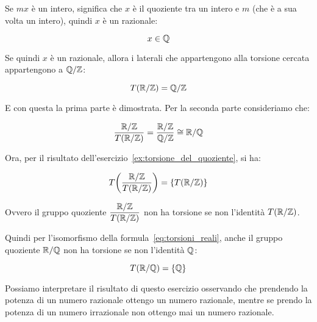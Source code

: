 \begin{soluzione}
	Se $mx$ è un intero, significa che $x$ è il quoziente tra un intero e $m$ (che è a sua volta un intero), quindi $x$ è un razionale:
	
	\begin{equation}
		x \in \mathbb{Q}
	\end{equation} 

	Se quindi $x$ è un razionale, allora i laterali che appartengono alla torsione cercata appartengono a $\mathbb{Q}/\mathbb{Z}$:
	
	\begin{equation}
		T(\mathbb{R}/\mathbb{Z}) = \mathbb{Q}/\mathbb{Z}
	\end{equation}

	E con questa la prima parte è dimostrata. Per la seconda parte consideriamo che:
	
	\begin{equation}
		\label{eq:torsioni_reali}
		\dfrac{\mathbb{R}/\mathbb{Z}}{T(\mathbb{R}/\mathbb{Z})} = \dfrac{\mathbb{R}/\mathbb{Z}}{\mathbb{Q}/\mathbb{Z}} \cong \mathbb{R}/\mathbb{Q}
	\end{equation}

	Ora, per il risultato dell'esercizio~\ref{ex:torsione_del_quoziente}, si ha:
	
	\begin{equation}
		T\biggl(\dfrac{\mathbb{R}/\mathbb{Z}}{T(\mathbb{R}/\mathbb{Z})}\biggr) = \{T(\mathbb{R}/\mathbb{Z})\}
	\end{equation}

	Ovvero il gruppo quoziente $\dfrac{\mathbb{R}/\mathbb{Z}}{T(\mathbb{R}/\mathbb{Z})}$ non ha torsione se non l'identità $T(\mathbb{R}/\mathbb{Z})$.

	Quindi per l'isomorfismo della formula~\eqref{eq:torsioni_reali}, anche il gruppo quoziente $\mathbb{R}/\mathbb{Q}$ non ha torsione se non l'identità $\mathbb{Q}$:
	
	\begin{equation}
		T(\mathbb{R}/\mathbb{Q}) = \{\mathbb{Q}\}
	\end{equation}
	
\end{soluzione}

Possiamo interpretare il risultato di questo esercizio osservando che prendendo la potenza di un numero razionale ottengo un numero razionale, mentre se prendo la potenza di un numero irrazionale non ottengo mai un numero razionale.

